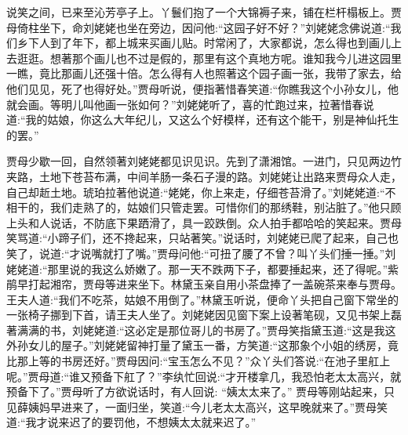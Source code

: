 \begin{parag}
    说笑之间，已来至沁芳亭子上。丫鬟们抱了一个大锦褥子来，铺在栏杆榻板上。贾母倚柱坐下，命刘姥姥也坐在旁边，因问他:“这园子好不好？”刘姥姥念佛说道:“我们乡下人到了年下，都上城来买画儿贴。时常闲了，大家都说，怎么得也到画儿上去逛逛。想著那个画儿也不过是假的，那里有这个真地方呢。谁知我今儿进这园里一瞧，竟比那画儿还强十倍。怎么得有人也照著这个园子画一张，我带了家去，给他们见见，死了也得好处。”贾母听说，便指著惜春笑道:“你瞧我这个小孙女儿，他就会画。等明儿叫他画一张如何？”刘姥姥听了，喜的忙跑过来，拉著惜春说道:“我的姑娘，你这么大年纪儿，又这么个好模样，还有这个能干，别是神仙托生的罢。”
\end{parag}


\begin{parag}
    贾母少歇一回，自然领著刘姥姥都见识见识。先到了潇湘馆。一进门，只见两边竹夹路，土地下苍苔布满，中间羊肠一条石子漫的路。刘姥姥让出路来贾母众人走，自己却赾土地。琥珀拉著他说道:“姥姥，你上来走，仔细苍苔滑了。”刘姥姥道:“不相干的，我们走熟了的，姑娘们只管走罢。可惜你们的那绣鞋，别沾脏了。”他只顾上头和人说话，不防底下果跴滑了，具一跤跌倒。众人拍手都哈哈的笑起来。贾母笑骂道:“小蹄子们，还不搀起来，只站著笑。”说话时，刘姥姥已爬了起来，自己也笑了，说道:“才说嘴就打了嘴。”贾母问他:“可扭了腰了不曾？叫丫头们捶一捶。”刘姥姥道:“那里说的我这么娇嫩了。那一天不跌两下子，都要捶起来，还了得呢。”紫鹃早打起湘帘，贾母等进来坐下。林黛玉亲自用小茶盘捧了一盖碗茶来奉与贾母。王夫人道:“我们不吃茶，姑娘不用倒了。”林黛玉听说，便命丫头把自己窗下常坐的一张椅子挪到下首，请王夫人坐了。刘姥姥因见窗下案上设著笔砚，又见书架上磊著满满的书，刘姥姥道:“这必定是那位哥儿的书房了。”贾母笑指黛玉道:“这是我这外孙女儿的屋子。”刘姥姥留神打量了黛玉一番，方笑道:“这那象个小姐的绣房，竟比那上等的书房还好。”贾母因问:“宝玉怎么不见？”众丫头们答说:“在池子里舡上呢。”贾母道:“谁又预备下舡了？”李纨忙回说:“才开楼拿几，我恐怕老太太高兴，就预备下了。”贾母听了方欲说话时，有人回说: “姨太太来了。” 贾母等刚站起来，只见薛姨妈早进来了，一面归坐，笑道:“今儿老太太高兴，这早晚就来了。”贾母笑道:“我才说来迟了的要罚他，不想姨太太就来迟了。”
\end{parag}


